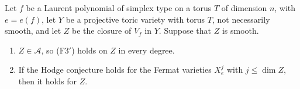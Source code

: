 \begin{theorem}\label{thm:simplextype}
Let $f$ be a Laurent polynomial of simplex type on a torus $T$ of dimension
$n$, with $e=e(f)$, let $Y$ be a projective toric variety with torus $T$,
not necessarily smooth, and let $Z$ be the closure of $V_{f}$ in $Y$.
Suppose that $Z$ is smooth.
\begin{enumerate}[label=\textup{(\roman*)},leftmargin=2.6em,itemsep=2pt]
\item $Z\in\mathcal{A}$, so \textup{(F3$'$)} holds on $Z$ in every degree.
\item If the Hodge conjecture holds for the Fermat varieties $X^{j}_{e}$
  with $j\le\dim Z$, then it holds for $Z$.
\end{enumerate}
\end{theorem}

